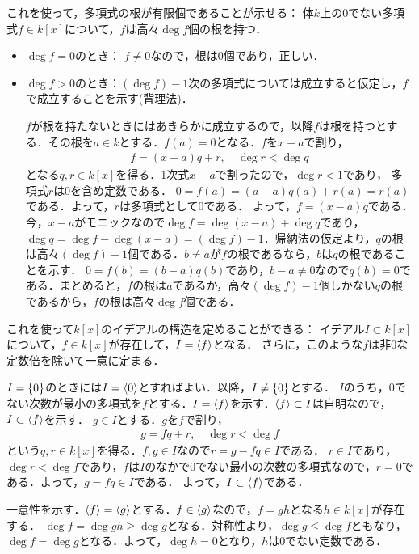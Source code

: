 \documentclass[9pt]{ltjsarticle}
\begin{document}
これを使って，多項式の根が有限個であることが示せる：
体$k$上の0でない多項式$f\in k[x]$について，$f$は高々$\deg f$個の根を持つ．
\begin{myproof}
 \begin{itemize}
  \item $\deg f = 0$のとき：
$f\neq 0$なので，根は0個であり，正しい．
  \item $\deg f > 0$のとき：$(\deg f) -1$次の多項式については成立すると仮定し，$f$で成立することを示す(背理法)．

$f$が根を持たないときにはあきらかに成立するので，以降$f$は根を持つとする．その根を$a \in k$とする．$f(a)=0$となる．$f$を$x-a$で割り，
\begin{align}
 f = (x-a)q +r ,\quad \deg r < \deg q
\end{align}
となる$q,r\in k[x]$を得る．1次式$x-a$で割ったので，$\deg r < 1$であり，
多項式$r$は0を含め定数である．
$0=f(a)=(a-a)q(a) + r(a) = r(a)$である．よって，$r$は多項式として0である．
よって，$f=(x-a)q$である．
今，$x-a$がモニックなので$\deg f = \deg (x-a) + \deg q$であり，$\deg q = \deg f - \deg (x-a) = (\deg f) - 1$．帰納法の仮定より，$q$の根は高々$(\deg f)-1$個である．$b\neq a$が$f$の根であるなら，$b$は$q$の根であることを示す．
$0=f(b)=(b-a)q(b)$であり，$b-a\neq 0$なので$q(b)=0$である．まとめると，$f$の根は$a$であるか，高々$(\deg f)-1$個しかない$q$の根であるから，$f$の根は高々$\deg f$個である．
 \end{itemize}

\end{myproof}

これを使って$k[x]$のイデアルの構造を定めることができる：
イデアル$I\subset k[x]$について，$f\in k[x]$が存在して，$I = \left\langle f \right\rangle$となる．
さらに，このような$f$は非0な定数倍を除いて一意に定まる．
\begin{myproof}
 $I=\{0\}$のときには$I=\left\langle 0 \right\rangle$とすればよい．以降，$I\neq \{0\}$とする．
$I$のうち，0でない次数が最小の多項式を$f$とする．$I = \left\langle f \right\rangle$を示す．$\left\langle f \right\rangle \subset I$は自明なので，$I\subset \left\langle f \right\rangle$を示す．
$g\in I$とする．$g$を$f$で割り，
\begin{align}
 g = fq + r,\quad \deg r < \deg f
\end{align}
という$q,r\in k[x]$を得る．$f,g\in I$なので$r = g-fq \in I$である．
$r\in I$であり，$\deg r < \deg f$であり，$f$は$I$のなかで0でない最小の次数の多項式なので，$r = 0$である．よって，$g=fq \in I$である．
よって，$I\subset \left\langle f \right\rangle$である．

一意性を示す．$\left\langle f \right\rangle=\left\langle g \right\rangle$とする．$f\in \left\langle g \right\rangle$なので，$f=gh$となる$h\in k[x]$が存在する．
$\deg f = \deg gh \ge \deg g$となる．対称性より，$\deg g \le \deg f$ともなり，$\deg f = \deg g$となる．よって，$\deg h = 0$となり，$h$は0でない定数である．
\end{myproof}
\end{document}
